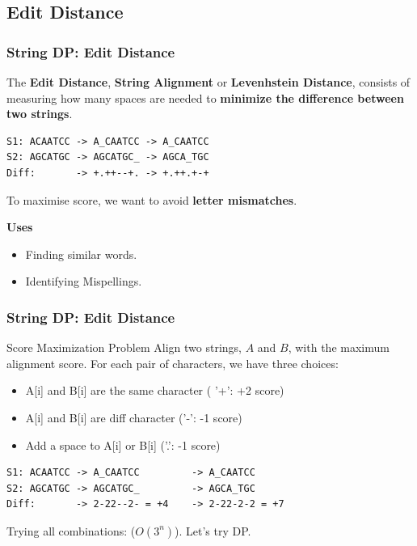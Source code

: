 \documentclass{beamer}
\begin{document}
\subsection{Edit Distance}
\begin{frame}[fragile]
  \frametitle{String DP: Edit Distance}
  \begin{block}{}
    The {\bf Edit Distance}, {\bf String Alignment} or {\bf Levenhstein
    Distance}, consists of measuring how many spaces are needed to {\bf
    minimize the difference between two strings}.\bigskip

\begin{verbatim}
S1: ACAATCC -> A_CAATCC -> A_CAATCC
S2: AGCATGC -> AGCATGC_ -> AGCA_TGC
Diff:       -> +.++--+. -> +.++.+-+
\end{verbatim}\bigskip

  To maximise score, we want to avoid {\bf letter mismatches}.
  \end{block}

  {\bf Uses}
  \begin{itemize}
    \item Finding similar words.
    \item Identifying Mispellings.
  \end{itemize}
\end{frame}


\begin{frame}[fragile]
  \frametitle{String DP: Edit Distance}
  \begin{block}{Score Maximization Problem}
    Align two strings, $A$ and $B$, with the maximum alignment score.
    For each pair of characters, we have three choices:

    \begin{itemize}
    \item A[i] and B[i] are the same character ( '+': +2 score)
    \item A[i] and B[i] are diff character ('-': -1 score)
    \item Add a space to A[i] or B[i] ('.': -1 score)
    \end{itemize}
  \end{block}

\begin{verbatim}
S1: ACAATCC -> A_CAATCC         -> A_CAATCC
S2: AGCATGC -> AGCATGC_         -> AGCA_TGC
Diff:       -> 2-22--2- = +4    -> 2-22-2-2 = +7
\end{verbatim}

Trying all combinations: ($O(3^n)$). Let's try DP.
\end{frame}
\end{document}
